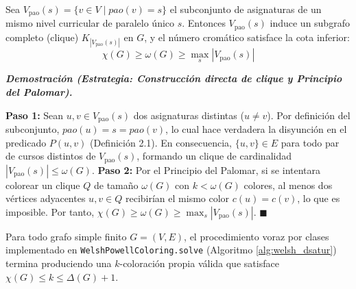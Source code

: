 \documentclass[12pt,a4paper]{article}
\theoremstyle{definition}
\newenvironment{demostracion}[1][Demostración]{%
    \begin{singlespace}\small\noindent\textbf{\textit{#1.}}
}{%
    \hfill$\blacksquare$\end{singlespace}\vspace{0.25em}
}
\begin{document}
\begin{singlespace}
\begin{proposicion}
Sea $V_{\text{pao}}(s) = \{v \in V \mid pao(v) = s\}$ el subconjunto de asignaturas de un mismo nivel curricular de paralelo único $s$. Entonces $V_{\text{pao}}(s)$ induce un subgrafo completo (clique) $K_{|V_{\text{pao}}(s)|}$ en $G$, y el número cromático satisface la cota inferior:
\[
\chi(G) \ge \omega(G) \ge \max_{s} |V_{\text{pao}}(s)|
\]
\end{proposicion}
\end{singlespace}

\begin{demostracion}[Demostración (Estrategia: Construcción directa de clique y Principio del Palomar)]
\textbf{Paso 1:} Sean $u, v \in V_{\text{pao}}(s)$ dos asignaturas distintas ($u \neq v$). Por definición del subconjunto, $pao(u) = s = pao(v)$, lo cual hace verdadera la disyunción en el predicado $P(u, v)$ (Definición 2.1). En consecuencia, $\{u, v\} \in E$ para todo par de cursos distintos de $V_{\text{pao}}(s)$, formando un clique de cardinalidad $|V_{\text{pao}}(s)| \le \omega(G)$.
\textbf{Paso 2:} Por el Principio del Palomar, si se intentara colorear un clique $Q$ de tamaño $\omega(G)$ con $k < \omega(G)$ colores, al menos dos vértices adyacentes $u, v \in Q$ recibirían el mismo color $c(u) = c(v)$, lo que es imposible. Por tanto, $\chi(G) \ge \omega(G) \ge \max_s |V_{\text{pao}}(s)|$.
\end{demostracion}

\begin{singlespace}
\begin{proposicion}
Para todo grafo simple finito $G = (V, E)$, el procedimiento voraz por clases implementado en \texttt{WelshPowellColoring.solve} (Algoritmo \ref{alg:welsh_dsatur}) termina produciendo una $k$-coloración propia válida que satisface $\chi(G) \le k \le \Delta(G) + 1$.
\end{proposicion}
\end{singlespace}
\end{document}
